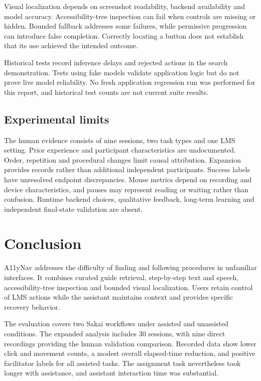 \documentclass[11pt,a4paper]{article}
\begin{document}
Visual localization depends on screenshot readability, backend availability and model accuracy. Accessibility-tree inspection can fail when controls are missing or hidden. Bounded fallback addresses some failures, while permissive progression can introduce false completion. Correctly locating a button does not establish that its use achieved the intended outcome.

Historical tests record inference delays and rejected actions in the search demonstration. Tests using fake models validate application logic but do not prove live model reliability. No fresh application regression run was performed for this report, and historical test counts are not current suite results.

\subsection{Experimental limits}
The human evidence consists of nine sessions, two task types and one LMS setting. Prior experience and participant characteristics are undocumented. Order, repetition and procedural changes limit causal attribution. Expansion provides records rather than additional independent participants. Success labels have unresolved endpoint discrepancies. Mouse metrics depend on recording and device characteristics, and pauses may represent reading or waiting rather than confusion. Runtime backend choices, qualitative feedback, long-term learning and independent final-state validation are absent.

\section{Conclusion}
A11yNav addresses the difficulty of finding and following procedures in unfamiliar interfaces. It combines curated guide retrieval, step-by-step text and speech, accessibility-tree inspection and bounded visual localization. Users retain control of LMS actions while the assistant maintains context and provides specific recovery behavior.

The evaluation covers two Sakai workflows under assisted and unassisted conditions. The expanded analysis includes 30 sessions, with nine direct recordings providing the human validation comparison. Recorded data show lower click and movement counts, a modest overall elapsed-time reduction, and positive facilitator labels for all assisted tasks. The assignment task nevertheless took longer with assistance, and assistant interaction time was substantial.
\end{document}
